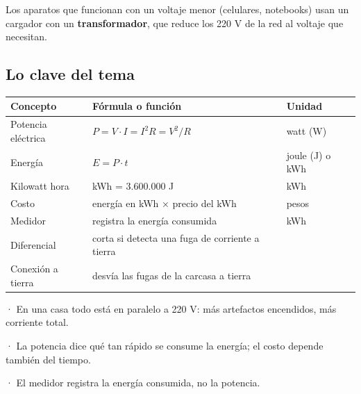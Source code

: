 \begin{clave}[{Recuerda}] Los aparatos que funcionan con un voltaje menor (celulares, notebooks) usan un cargador con un \textbf{transformador}, que reduce los 220 V de la red al voltaje que necesitan.\end{clave}
\subsection{Lo clave del tema}
\begin{center}\small
\begin{tabularx}{\linewidth}{@{}>{\raggedright\arraybackslash\hsize=0.74\hsize}X>{\raggedright\arraybackslash\hsize=1.64\hsize}X>{\raggedright\arraybackslash\hsize=0.62\hsize}X@{}}
\toprule
\textbf{Concepto} & \textbf{Fórmula o función} & \textbf{Unidad} \\
\midrule
Potencia eléctrica & $P = V\cdot I = I^2 R = V^2/R$ & watt (W) \\
Energía & $E = P\cdot t$ & joule (J) o kWh \\
Kilowatt hora & 1 kWh = 3.600.000 J & kWh \\
Costo & energía en kWh × precio del kWh & pesos \\
Medidor & registra la energía consumida & kWh \\
Diferencial & corta si detecta una fuga de corriente a tierra &  \\
Conexión a tierra & desvía las fugas de la carcasa a tierra &  \\
\bottomrule
\end{tabularx}
\end{center}
 
\begin{clave}[{Recuerda}] · En una casa todo está en paralelo a 220 V: más artefactos encendidos, más corriente total.\par · La potencia dice qué tan rápido se consume la energía; el costo depende también del tiempo.\par · El medidor registra la energía consumida, no la potencia.\end{clave}
 

